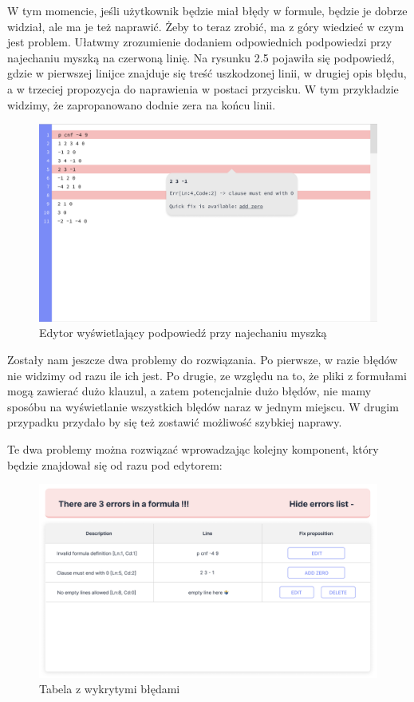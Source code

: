 \documentclass[a4paper,12pt,oneside]{book}
\theoremstyle{definition}
\begin{document}
W tym momencie, jeśli użytkownik będzie miał błędy w formule, będzie je dobrze widział, ale ma je też naprawić. Żeby to teraz zrobić, ma z góry wiedzieć w czym jest problem. Ułatwmy zrozumienie dodaniem odpowiednich podpowiedzi przy najechaniu myszką na czerwoną linię. Na rysunku 2.5 pojawiła się podpowiedź, gdzie w pierwszej linijce znajduje się treść uszkodzonej linii, w drugiej opis błędu, a w trzeciej propozycja do naprawienia w postaci przycisku. W tym przykładzie widzimy, że zapropanowano dodnie zera na końcu linii.

\begin{figure}[ht]
    \centering
    \includegraphics[width=14.30cm]{5}
    \caption{Edytor wyświetlający podpowiedź przy najechaniu myszką}
    \label{fig:5}
\end{figure}

\newpage

Zostały nam jeszcze dwa problemy do rozwiązania. Po pierwsze, w razie błędów nie widzimy od razu ile ich jest. Po drugie, ze względu na to, że pliki z formułami mogą zawierać dużo klauzul, a zatem potencjalnie dużo błędów, nie mamy sposóbu na wyświetlanie wszystkich blędów naraz w jednym miejscu. W drugim przypadku przydało by się też zostawić możliwość szybkiej naprawy. 

Te dwa problemy można rozwiązać wprowadzając kolejny komponent, który będzie znajdował się od razu pod edytorem: 

\begin{figure}[ht]
    \centering
    \includegraphics[width=14.30cm]{6}
    \caption{Tabela z wykrytymi błędami}
    \label{fig:6}
\end{figure}
\end{document}
